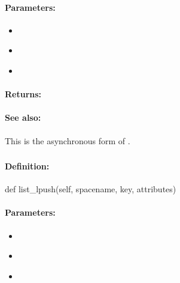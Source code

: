 \paragraph{Parameters:}
\begin{itemize}[noitemsep]
\item {}\\

\item {}\\

\item {}\\

\end{itemize}

\paragraph{Returns:}


\paragraph{See also:}  This is the asynchronous form of .

\pagebreak
\subsubsection{}
\label{api:python:list_lpush}


\paragraph{Definition:}
\begin{pythoncode}
def list_lpush(self, spacename, key, attributes)
\end{pythoncode}

\paragraph{Parameters:}
\begin{itemize}[noitemsep]
\item {}\\

\item {}\\

\item {}\\

\end{itemize}

